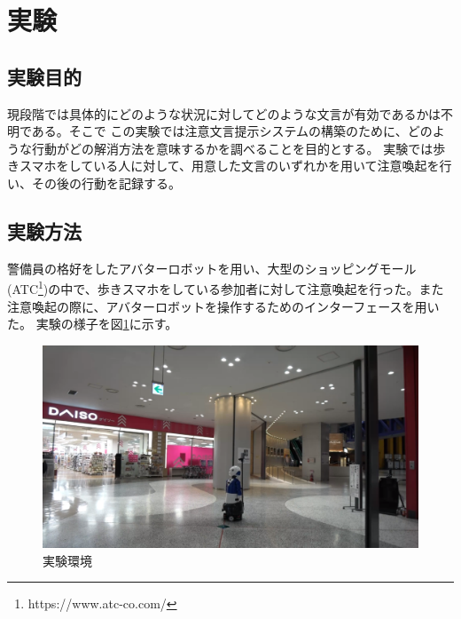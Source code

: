 \documentclass{kuisthesis}
\begin{document}
\section{実験}
\subsection{実験目的}
現段階では具体的にどのような状況に対してどのような文言が有効であるかは不明である。そこで
この実験では注意文言提示システムの構築のために、どのような行動がどの解消方法を意味するかを調べることを目的とする。
実験では歩きスマホをしている人に対して、用意した文言のいずれかを用いて注意喚起を行い、その後の行動を記録する。

\subsection{実験方法}
警備員の格好をしたアバターロボットを用い、大型のショッピングモール(ATC\footnote{https://www.atc-co.com/})の中で、歩きスマホをしている参加者に対して注意喚起を行った。また注意喚起の際に、アバターロボットを操作するためのインターフェースを用いた。
実験の様子を図\ref{fig: Experiment}に示す。
\begin{figure}[H]
  \includegraphics[width=15cm]{img/Experiment.png}
  \caption{実験環境}
  \label{fig: Experiment}
\end{figure}
\end{document}
